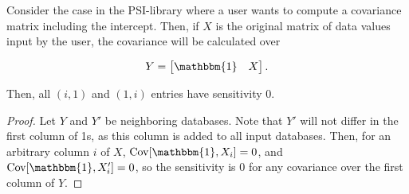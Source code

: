 \documentclass[11pt, oneside]{article}   	%
\begin{document}
\begin{theorem}
Consider the case in the PSI-library where a user wants to compute a covariance matrix including the intercept. Then, if $X$ is the original matrix of data values input by the user, the covariance will be calculated over 

$$
Y =
\begin{bmatrix}
\mathbbm{1} & X\\
\end{bmatrix}.
$$

Then, all $(i,1)$ and $(1,i)$ entries have sensitivity 0.
\end{theorem}

\begin{proof}

Let $Y$ and $Y'$ be neighboring databases. Note that $Y'$ will not differ in the first column of 1s, as this column is added to all input databases. Then, for an arbitrary column $i$ of $X$,
$\cov[\mathbbm{1},X_i] = 0$, and $\cov[\mathbbm{1},X_i'] = 0$, so the sensitivity is 0 for any covariance over the first column of $Y$.
\end{proof}
\end{document}
